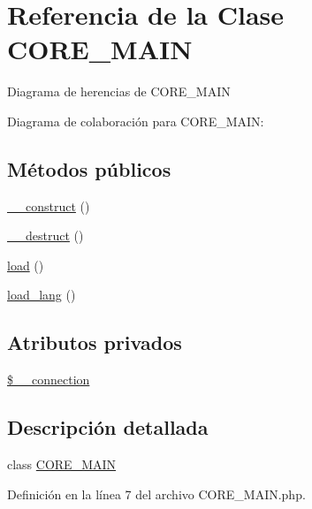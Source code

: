 \hypertarget{classCORE__MAIN}{\section{Referencia de la Clase C\-O\-R\-E\-\_\-\-M\-A\-I\-N}
\label{classCORE__MAIN}
}


Diagrama de herencias de C\-O\-R\-E\-\_\-\-M\-A\-I\-N


Diagrama de colaboración para C\-O\-R\-E\-\_\-\-M\-A\-I\-N\-:
\subsection*{Métodos públicos}
\begin{DoxyCompactItemize}
\item 
\hyperlink{classCORE__MAIN_a095c5d389db211932136b53f25f39685}{\-\_\-\-\_\-construct} ()
\item 
\hyperlink{classCORE__MAIN_a421831a265621325e1fdd19aace0c758}{\-\_\-\-\_\-destruct} ()
\item 
\hyperlink{classCORE__MAIN_a4dcaa8f72c8423d4de25a9e87fa6f3e4}{load} ()
\item 
\hyperlink{classCORE__MAIN_a1d64f5070060eb620b056287d2fcf74a}{load\-\_\-lang} ()
\end{DoxyCompactItemize}
\subsection*{Atributos privados}
\begin{DoxyCompactItemize}
\item 
\hyperlink{classCORE__MAIN_abd5f7a732ba4cb0bfaa73c41f179cffd}{\$\-\_\-\-\_\-connection}
\end{DoxyCompactItemize}


\subsection{Descripción detallada}
class \hyperlink{classCORE__MAIN}{C\-O\-R\-E\-\_\-\-M\-A\-I\-N} 

Definición en la línea 7 del archivo C\-O\-R\-E\-\_\-\-M\-A\-I\-N.\-php.




